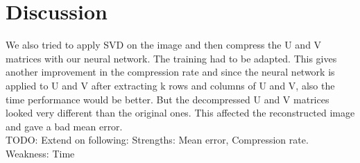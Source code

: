 \section{Discussion} \label{sec:discussion}

We also tried to apply SVD on the image and then compress the U and V matrices with our neural network. The training had to be adapted. This gives another improvement in the compression rate and since the neural network is applied to U and V after extracting k rows and columns of U and V, also the time performance would be better. But the decompressed U and V matrices looked very different than the original ones. This affected the reconstructed image and gave a bad mean error.\\

{\color{red} TODO: Extend on following: }
Strengths: Mean error, Compression rate.\\ 
Weakness: Time
